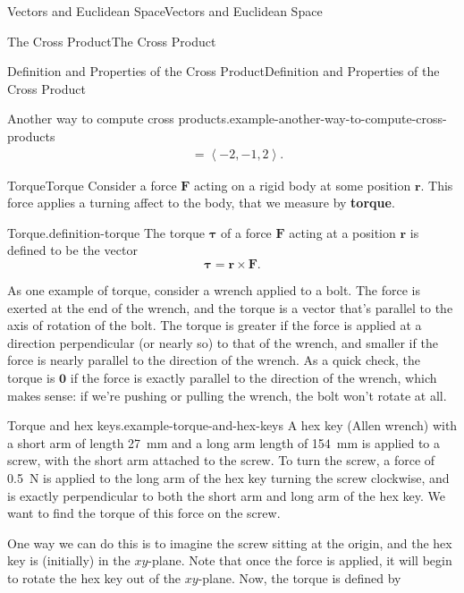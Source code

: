 \documentclass[10pt,]{book}
\newcommand{\terminology}[1]{\textbf{#1}}
\numberwithin{equation}{section}
\newcommand{\vv}[1]{\mathbf{#1}}
\newcommand{\dotprod}[1]{\left\langle #1 \right\rangle}
\begin{document}
\begin{chapterptx}{Vectors and Euclidean Space}{}{Vectors and Euclidean Space}{}{}
\begin{sectionptx}{The Cross Product}{}{The Cross Product}{}{}
\begin{subsectionptx}{Definition and Properties of the Cross Product}{}{Definition and Properties of the Cross Product}{}{}
\begin{example}{Another way to compute cross products.}{example-another-way-to-compute-cross-products}
\begin{align*}
& = \dotprod{-2,-1,2}. 
\end{align*}
\end{example}
\end{subsectionptx}
%
%
\typeout{************************************************}
\typeout{************************************************}
%
\begin{subsectionptx}{Torque}{}{Torque}{}{}\label{subsection-torque}
\hypertarget{p-974}{}%
Consider a force \(\vv{F}\) acting on a rigid body at some position \(\vv{r}\). This force applies a turning affect to the body, that we measure by \terminology{torque}.%
\begin{definition}{Torque.}{definition-torque}%
\hypertarget{p-975}{}%
The torque \(\boldsymbol{\tau}\) of a force \(\vv{F}\) acting at a position \(\vv{r}\) is defined to be the vector%
%
\begin{equation*}
\boldsymbol{\tau} = \vv{r}\times\vv{F}.
\end{equation*}
\end{definition}
\hypertarget{p-976}{}%
As one example of torque, consider a wrench applied to a bolt. The force is exerted at the end of the wrench, and the torque is a vector that's parallel to the axis of rotation of the bolt. The torque is greater if the force is applied at a direction perpendicular (or nearly so) to that of the wrench, and smaller if the force is nearly parallel to the direction of the wrench. As a quick check, the torque is \(\vv{0}\) if the force is exactly parallel to the direction of the wrench, which makes sense: if we're pushing or pulling the wrench, the bolt won't rotate at all.%
\begin{example}{Torque and hex keys.}{example-torque-and-hex-keys}%
\hypertarget{p-977}{}%
A hex key (Allen wrench) with a short arm of length \SI{27}{\milli\meter} and a long arm length of \SI{154}{\milli\meter} is applied to a screw, with the short arm attached to the screw. To turn the screw, a force of \SI{0.5}{\newton} is applied to the long arm of the hex key turning the screw clockwise, and is exactly perpendicular to both the short arm and long arm of the hex key. We want to find the torque of this force on the screw.%
\par
\hypertarget{p-978}{}%
One way we can do this is to imagine the screw sitting at the origin, and the hex key is (initially) in the \(xy\)-plane. Note that once the force is applied, it will begin to rotate the hex key out of the \(xy\)-plane. Now, the torque is defined by%
%

\end{example}
\end{subsectionptx}
\end{sectionptx}
\end{chapterptx}
\end{document}
